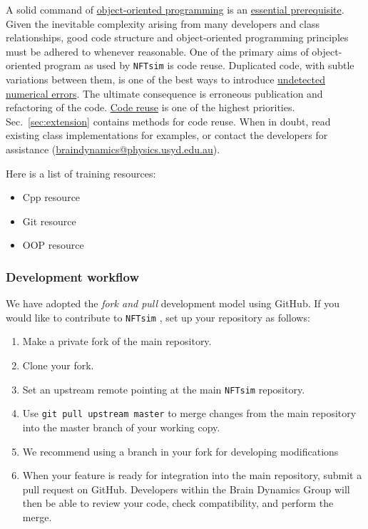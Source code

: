 \documentclass[12pt,a4paper]{article}
\newcommand{\type}[1]{{\small\small\tt #1} }
\newcommand{\NF}[0]{\type{NFTsim}}
\begin{document}
A solid command of \underline{object-oriented programming} is an \underline{essential prerequisite}. Given the inevitable complexity arising from many developers and class relationships, good code structure and object-oriented programming principles must be adhered to whenever reasonable. One of the primary aims of object-oriented program as used by \NF is code reuse. Duplicated code, with subtle variations between them, is one of the best ways to introduce \underline{undetected numerical errors}. The ultimate consequence is erroneous publication and refactoring of the code. \underline{Code reuse} is one of the highest priorities. Sec.~\ref{sec:extension} contains methods for code reuse. When in doubt, read existing class implementations for examples, or contact the developers for assistance (\url{braindynamics@physics.usyd.edu.au}).

Here is a list of training resources:

\begin{itemize}
    \item Cpp resource
    \item Git resource
    \item OOP resource
\end{itemize}

\subsubsection{Development workflow}

We have adopted the {\em fork and pull} development model using GitHub. If you would like to contribute to \NF, set up your repository as follows:

\begin{enumerate}
    \item Make a private fork of the main repository.
    \item Clone your fork.
    \item Set an upstream remote pointing at the main \NF repository.
    \item Use \type{git pull upstream master} to merge changes from the main repository into the master branch of your working copy.
    \item We recommend using a branch in your fork for developing modifications
    \item When your feature is ready for integration into the main repository, submit a pull request on GitHub. Developers within the Brain Dynamics Group will then be able to review your code, check compatibility, and perform the merge.
\end{enumerate}
\end{document}
